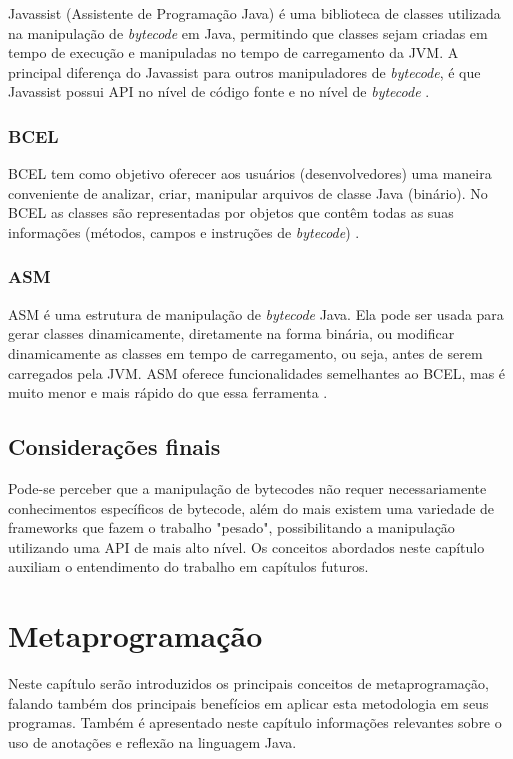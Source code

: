 \documentclass[tc,openright]{iiufrgs}
\begin{document}
Javassist (Assistente de Programação Java) é uma biblioteca de classes utilizada na manipulação de \textit{bytecode} em Java, permitindo que classes sejam criadas em tempo de execução e manipuladas no tempo de carregamento da JVM. A principal diferença do Javassist para outros manipuladores de \textit{bytecode}, é que Javassist possui  API no nível de código fonte e no nível de \textit{bytecode} \cite{javassist}.
\subsection {BCEL}
BCEL tem como objetivo oferecer aos usuários (desenvolvedores) uma maneira conveniente de analizar, criar, manipular arquivos de classe Java (binário). No BCEL as classes são representadas por objetos que contêm todas as suas informações (métodos, campos e instruções de \textit{bytecode}) \cite{bcel}.
\subsection {ASM}
ASM é uma estrutura de manipulação de \textit{bytecode} Java. Ela pode ser usada para gerar classes dinamicamente, diretamente na forma binária, ou modificar dinamicamente as classes em tempo de carregamento, ou seja, antes de serem carregados pela JVM. ASM oferece funcionalidades semelhantes ao BCEL, mas é muito menor e mais rápido do que essa ferramenta \cite{asmjavasource}.

\section{Considerações finais}

Pode-se perceber que a manipulação de bytecodes não requer necessariamente conhecimentos específicos de bytecode, além do mais existem uma variedade de frameworks que fazem o trabalho "pesado", possibilitando a manipulação utilizando uma API de mais alto nível. Os conceitos abordados neste capítulo auxiliam o entendimento do trabalho em capítulos futuros.

\chapter{Metaprogramação}
Neste capítulo serão introduzidos  os principais conceitos de metaprogramação, falando também dos principais benefícios em aplicar esta metodologia em seus programas. Também é apresentado neste capítulo informações relevantes sobre o uso de anotações e reflexão na linguagem Java.
\end{document}
